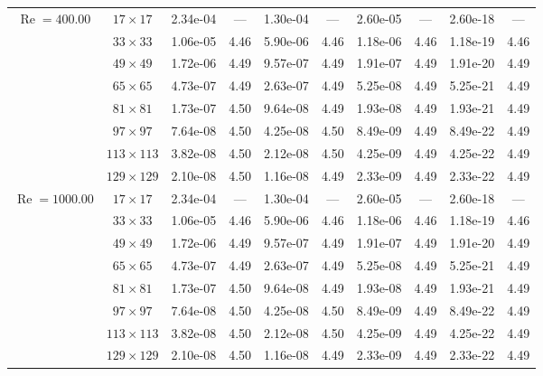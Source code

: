 \documentclass[preprint, 12pt]{elsarticle}
\begin{document}
\begin{center}
\begin{table}[H]
{\begin{tabular*}{\textwidth}{@{\extracolsep\fill}cccccccccc@{}}
    \hline
    \multirow{7}{*}{$\operatorname{Re}=400.00$} & $17\times 17$ & 2.34e-04 & --- & 1.30e-04 & --- & 2.60e-05 & --- & 2.60e-18 & --- \\
    & $33\times 33$ & 1.06e-05 & 4.46 & 5.90e-06 & 4.46 & 1.18e-06 & 4.46 & 1.18e-19 & 4.46 \\
    & $49\times 49$ & 1.72e-06 & 4.49 & 9.57e-07 & 4.49 & 1.91e-07 & 4.49 & 1.91e-20 & 4.49 \\
    \multirow{3}{*}{$\operatorname{Wi}=10$} & $65\times 65$ & 4.73e-07 & 4.49 & 2.63e-07 & 4.49 & 5.25e-08 & 4.49 & 5.25e-21 & 4.49 \\
    & $81\times 81$ & 1.73e-07 & 4.50 & 9.64e-08 & 4.49 & 1.93e-08 & 4.49 & 1.93e-21 & 4.49 \\
    & $97\times 97$ & 7.64e-08 & 4.50 & 4.25e-08 & 4.50 & 8.49e-09 & 4.49 & 8.49e-22 & 4.49 \\
    & $113\times 113$ & 3.82e-08 & 4.50 & 2.12e-08 & 4.50 & 4.25e-09 & 4.49 & 4.25e-22 & 4.49 \\
    & $129\times 129$ & 2.10e-08 & 4.50 & 1.16e-08 & 4.49 & 2.33e-09 & 4.49 & 2.33e-22 & 4.49 \\
    \hline
    \multirow{7}{*}{$\operatorname{Re}=1000.00$} & $17\times 17$ & 2.34e-04 & --- & 1.30e-04 & --- & 2.60e-05 & --- & 2.60e-18 & --- \\
    & $33\times 33$ & 1.06e-05 & 4.46 & 5.90e-06 & 4.46 & 1.18e-06 & 4.46 & 1.18e-19 & 4.46 \\
    & $49\times 49$ & 1.72e-06 & 4.49 & 9.57e-07 & 4.49 & 1.91e-07 & 4.49 & 1.91e-20 & 4.49 \\
    \multirow{3}{*}{$\operatorname{Wi}=10$} & $65\times 65$ & 4.73e-07 & 4.49 & 2.63e-07 & 4.49 & 5.25e-08 & 4.49 & 5.25e-21 & 4.49 \\
    & $81\times 81$ & 1.73e-07 & 4.50 & 9.64e-08 & 4.49 & 1.93e-08 & 4.49 & 1.93e-21 & 4.49 \\
    & $97\times 97$ & 7.64e-08 & 4.50 & 4.25e-08 & 4.50 & 8.49e-09 & 4.49 & 8.49e-22 & 4.49 \\
    & $113\times 113$ & 3.82e-08 & 4.50 & 2.12e-08 & 4.50 & 4.25e-09 & 4.49 & 4.25e-22 & 4.49 \\
    & $129\times 129$ & 2.10e-08 & 4.50 & 1.16e-08 & 4.49 & 2.33e-09 & 4.49 & 2.33e-22 & 4.49 \\
    \hline
    \end{tabular*}
}
\end{table}
\end{center}
\end{document}
